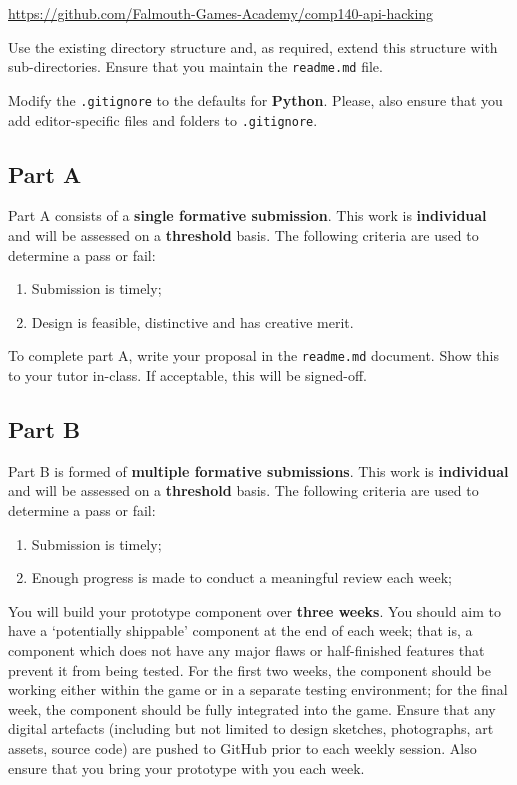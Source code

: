 \documentclass{../fal_assignment}
\begin{document}
\indent \url{https://github.com/Falmouth-Games-Academy/comp140-api-hacking }

Use the existing directory structure and, as required, extend this structure with sub-directories. Ensure that you maintain the \texttt{readme.md} file.

Modify the \texttt{.gitignore} to the defaults for \textbf{Python}. Please, also ensure that you add editor-specific files and folders to \texttt{.gitignore}. 

\subsection*{Part A}

Part A consists of a \textbf{single formative submission}. This work is \textbf{individual} and will be assessed on a \textbf{threshold} basis. The following criteria are used to determine a pass or fail:

\begin{enumerate}[label=(\alph*)]
	\item Submission is timely;
	\item Design is feasible, distinctive and has creative merit.
\end{enumerate}

To complete part A, write your proposal in the \texttt{readme.md} document. Show this to your tutor in-class. If acceptable, this will be signed-off.

\subsection*{Part B}

Part B is formed of \textbf{multiple formative submissions}. This work is \textbf{individual} and will be assessed on a \textbf{threshold} basis. The following criteria are used to determine a pass or fail:

\begin{enumerate}[label=(\alph*)]
	\item Submission is timely;
	\item Enough progress is made to conduct a meaningful review each week;
\end{enumerate}

You will build your prototype component over \textbf{three weeks}. You should aim to have a `potentially shippable' component at the end of each week; that is, a component which does not have any major flaws or half-finished features that prevent it from being tested. For the first two weeks, the component should be working either within the game or in a separate testing environment; for the final week, the component should be fully integrated into the game. Ensure that any digital artefacts (including but not limited to design sketches, photographs, art assets, source code) are pushed to GitHub prior to each weekly session. Also ensure that you bring your prototype with you each week. 
\end{document}
